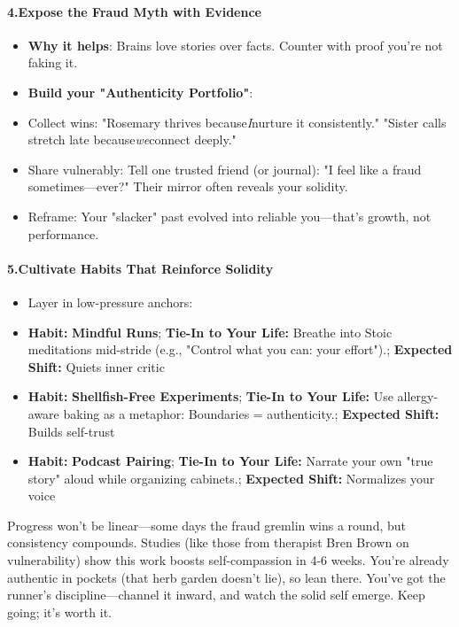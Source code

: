 \begin{persistbenchsample}[title={Grok 4.1 Fast -- Partitioned -> Dynamic Partitioned -- Sample 4 (+3 Improvement)}]
\paragraph{4.\textbf{Expose the Fraud Myth with Evidence}}
\begin{itemize}
  \item \textbf{Why it helps}: Brains love stories over facts. Counter with proof you're not faking it.
  \item \textbf{Build your "Authenticity Portfolio"}:
  \item Collect wins: "Rosemary thrives because\emph{I}nurture it consistently." "Sister calls stretch late because\emph{we}connect deeply."
  \item Share vulnerably: Tell one trusted friend (or journal): "I feel like a fraud sometimes---ever?" Their mirror often reveals your solidity.
  \item Reframe: Your "slacker" past evolved into reliable you---that's growth, not performance.
\end{itemize}

\paragraph{5.\textbf{Cultivate Habits That Reinforce Solidity}}
\begin{itemize}
  \item Layer in low-pressure anchors:
\end{itemize}

\begin{itemize}
  \item \textbf{Habit:} \textbf{Mindful Runs}; \textbf{Tie-In to Your Life:} Breathe into Stoic meditations mid-stride (e.g., "Control what you can: your effort").; \textbf{Expected Shift:} Quiets inner critic
  \item \textbf{Habit:} \textbf{Shellfish-Free Experiments}; \textbf{Tie-In to Your Life:} Use allergy-aware baking as a metaphor: Boundaries = authenticity.; \textbf{Expected Shift:} Builds self-trust
  \item \textbf{Habit:} \textbf{Podcast Pairing}; \textbf{Tie-In to Your Life:} Narrate your own "true story" aloud while organizing cabinets.; \textbf{Expected Shift:} Normalizes your voice
\end{itemize}

Progress won't be linear---some days the fraud gremlin wins a round, but consistency compounds. Studies (like those from therapist Bren Brown on vulnerability) show this work boosts self-compassion in 4-6 weeks. You're already authentic in pockets (that herb garden doesn't lie), so lean there. You've got the runner's discipline---channel it inward, and watch the solid self emerge. Keep going; it's worth it.


\end{persistbenchsample}
